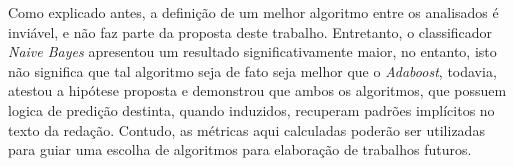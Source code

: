 Como explicado antes, a definição de um melhor algoritmo entre os analisados é 
inviável, e não faz parte da proposta deste trabalho. Entretanto, o 
classificador \textit{Naive Bayes} apresentou um resultado significativamente 
maior, no entanto, isto não significa que tal algoritmo seja de fato seja melhor 
que o \textit{Adaboost}, todavia, atestou a hipótese proposta e demonstrou que 
ambos os algoritmos, que possuem logica de predição destinta, quando 
induzidos, recuperam padrões implícitos no texto da redação. Contudo, as 
métricas aqui calculadas poderão ser utilizadas para guiar uma escolha de 
algoritmos para elaboração de trabalhos futuros.